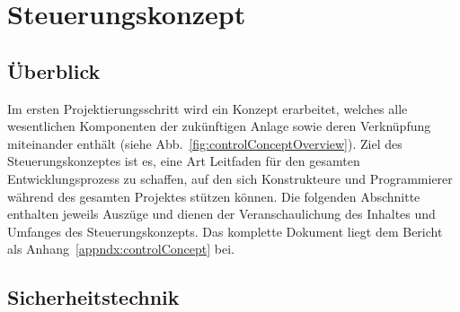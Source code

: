 

\section{Steuerungskonzept}
\label{sec:controlConcept}

\subsection{Überblick}

Im ersten Projektierungsschritt wird ein Konzept erarbeitet, welches alle wesentlichen Komponenten der zukünftigen Anlage sowie deren Verknüpfung miteinander enthält (siehe Abb.~\ref{fig:controlConceptOverview}). Ziel des Steuerungskonzeptes ist es, eine Art Leitfaden für den gesamten Entwicklungsprozess zu schaffen, auf den sich Konstrukteure und Programmierer während des gesamten Projektes stützen können.
Die folgenden Abschnitte enthalten jeweils Auszüge und dienen der Veranschaulichung des Inhaltes und Umfanges des Steuerungskonzepts. Das komplette Dokument liegt dem Bericht als Anhang~\ref{appndx:controlConcept} bei.


\subsection{Sicherheitstechnik}

